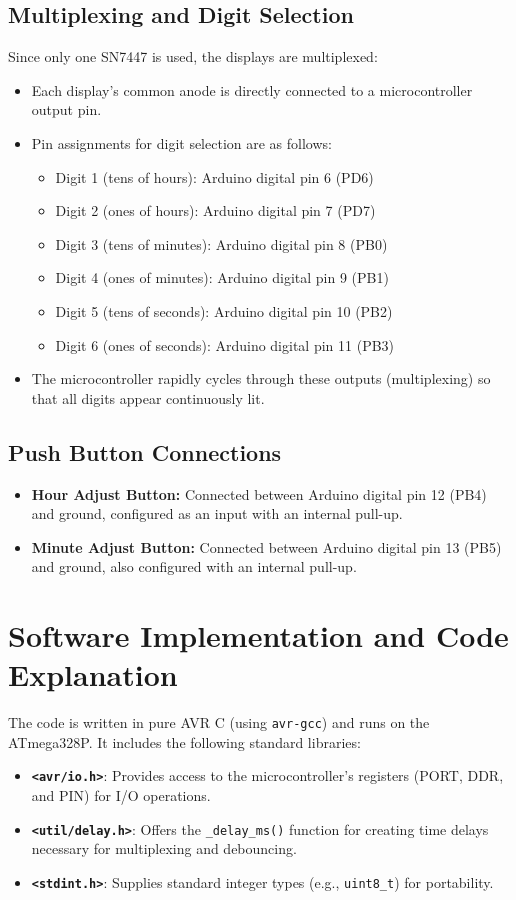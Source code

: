 \documentclass[12pt]{article}
\begin{document}
\subsection{Multiplexing and Digit Selection}
Since only one SN7447 is used, the displays are multiplexed:
\begin{itemize}
    \item Each display’s common anode is directly connected to a microcontroller output pin.
    \item Pin assignments for digit selection are as follows:
    \begin{itemize}
        \item Digit 1 (tens of hours): Arduino digital pin 6 (PD6)
        \item Digit 2 (ones of hours): Arduino digital pin 7 (PD7)
        \item Digit 3 (tens of minutes): Arduino digital pin 8 (PB0)
        \item Digit 4 (ones of minutes): Arduino digital pin 9 (PB1)
        \item Digit 5 (tens of seconds): Arduino digital pin 10 (PB2)
        \item Digit 6 (ones of seconds): Arduino digital pin 11 (PB3)
    \end{itemize}
    \item The microcontroller rapidly cycles through these outputs (multiplexing) so that all digits appear continuously lit.
\end{itemize}

\subsection{Push Button Connections}
\begin{itemize}
    \item \textbf{Hour Adjust Button:}  
    Connected between Arduino digital pin 12 (PB4) and ground, configured as an input with an internal pull-up.
    \item \textbf{Minute Adjust Button:}  
    Connected between Arduino digital pin 13 (PB5) and ground, also configured with an internal pull-up.
\end{itemize}

\section{Software Implementation and Code Explanation}
The code is written in pure AVR C (using \texttt{avr-gcc}) and runs on the ATmega328P. It includes the following standard libraries:
\begin{itemize}
    \item \textbf{\texttt{<avr/io.h>}}: Provides access to the microcontroller's registers (PORT, DDR, and PIN) for I/O operations.
    \item \textbf{\texttt{<util/delay.h>}}: Offers the \texttt{\_delay\_ms()} function for creating time delays necessary for multiplexing and debouncing.
    \item \textbf{\texttt{<stdint.h>}}: Supplies standard integer types (e.g., \texttt{uint8\_t}) for portability.
\end{itemize}
\end{document}
